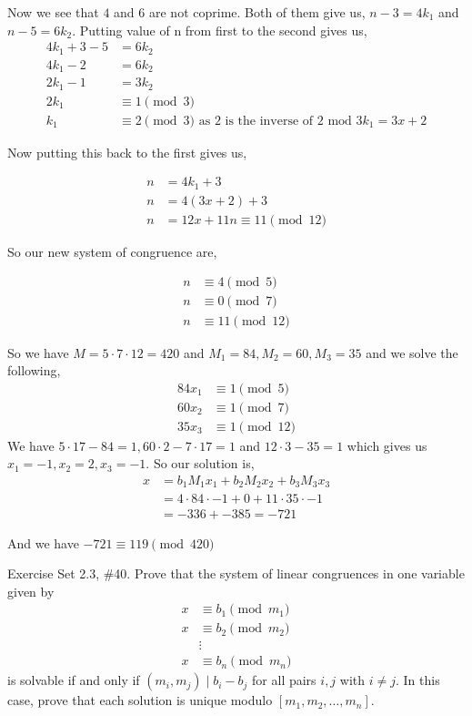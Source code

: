 \documentclass[12pt]{exam}
\begin{document}
\begin{questions}
Now we see that $4$ and $6$ are not coprime. Both of them give us, $n - 3 =4k_1$ and $n - 5 = 6k_2$. Putting value of n from first to the second gives us, 
\begin{align*}
    4k_1 + 3 - 5 &= 6k_2\\
    4k_1 -2 &= 6k_2\\
    2k_1 -1 &= 3k_2\\
    2k_1 & \equiv 1 \pmod 3\\
    k_1 & \equiv 2 \pmod 3 \text{ as $2$ is the inverse of $2$ mod $3$}
    k_1 = 3x + 2
\end{align*}

Now putting this back to the first gives us, 

\begin{align*}
    n  &= 4k_1 + 3\\
    n &= 4(3x + 2) + 3\\
    n &= 12x + 11
    n \equiv 11 \pmod {12}
\end{align*}


So our new system of congruence are,

\begin{align*}
    n &\equiv 4 \pmod 5\\
    n &\equiv 0 \pmod 7\\
    n & \equiv 11 \pmod {12}
\end{align*}

So we have $M = 5 \cdot 7 \cdot 12 = 420$ and  $M_1 = 84, M_2 = 60, M_3 = 35$ and we solve the following, 
\begin{align*}
    84 x_1 &\equiv 1 \pmod 5\\
    60 x_2 &\equiv 1 \pmod 7\\
    35 x_3 &\equiv 1 \pmod {12}
\end{align*}
We have $5 \cdot 17 - 84 = 1, 60 \cdot 2 - 7 \cdot 17 = 1$ and  $12 \cdot 3 - 35 = 1$ which gives us $x_1 = -1, x_2 = 2, x_3 = -1$. So our solution is, 
\begin{align*}
    x &= b_1M_1x_1 + b_2M_2x_2 + b_3M_3x_3 \\
        &= 4 \cdot 84 \cdot -1 + 0 + 11 \cdot 35 \cdot -1 \\
        &=  -336 + -385 = -721
\end{align*}

And we have $-721 \equiv 119 \pmod {420}$


            

\newpage 
\question  Exercise Set 2.3, \#40.
Prove that the system of linear congruences in one variable given by 
\begin{align*}
x & \equiv b_1 \pmod{m_1} \\
x & \equiv b_2 \pmod{m_2} \\
& \vdots \\
x & \equiv b_n \pmod{m_n}
\end{align*}
is solvable if and only if $(m_i,m_j) \mid b_i-b_j$ for all pairs $i,j$ with $i \neq j$. In this case, prove that each solution is unique modulo $[m_1,m_2,\ldots,m_n]$.


\end{questions}
\end{document}
